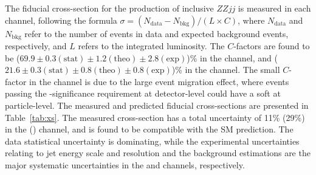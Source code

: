 The fiducial cross-section for the production of inclusive $ZZjj$ is measured in each channel, following the formula $\sigma = (N_{\mathrm{data}} - N_{\mathrm{bkg}}) / (L \times C)$,
where $N_{\mathrm{data}}$ and $N_{\mathrm{bkg}}$ refer to the number of events in data and expected background events, respectively, and $L$ refers to the integrated luminosity.
The $C$-factors are found to be ($69.9 \pm 0.3(\mathrm{stat}) \pm 1.2(\mathrm{theo}) \pm 2.8(\mathrm{exp})$)\% in the \lllljj channel,
and ($21.6 \pm 0.3(\mathrm{stat}) \pm 0.8(\mathrm{theo}) \pm 0.8(\mathrm{exp})$)\% in the \llvvjj channel.
The small $C$-factor in the \llvvjj channel is due to the large event migration effect,
where events passing the \met-significance requirement at detector-level could have a soft \met at particle-level.
The measured and predicted fiducial cross-sections are presented in Table~\ref{tab:xs}.
The measured cross-section has a total uncertainty of 11\% (29\%) in the \lllljj (\llvvjj) channel, and is found to be compatible with the SM prediction.
The data statistical uncertainty is dominating, while the experimental uncertainties relating to jet energy scale and resolution and the background estimations are the major systematic uncertainties in the \lllljj and \llvvjj channels, respectively.

\begin{table}[!htbp]
\begin{center}
\end{center}
\caption{
Measured and predicted fiducial cross-sections in both the \lllljj and \llvvjj channels.
Uncertainties due to different sources are presented.
}
\label{tab:xs}
\end{table}

